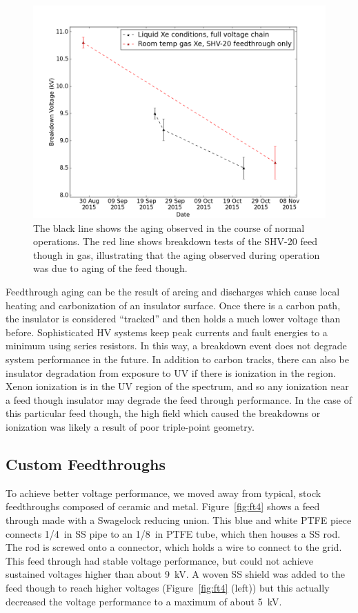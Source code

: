 \begin{figure}[htbp]
\begin{center}
\includegraphics[width=5in]{figures/testbed/shv20_breakdowns.png}
\caption{The black line shows the aging observed in the course of normal operations. The red line shows breakdown tests of the SHV-20 feed though in gas, illustrating that the aging observed during operation was due to aging of the feed though.}
\label{fig:aging}
\end{center}
\end{figure}

Feedthrough aging can be the result of arcing and discharges which cause local heating and carbonization of an insulator surface. Once there is a carbon path, the insulator is considered ``tracked'' and then holds a much lower voltage than before.  Sophisticated \ac{HV} systems keep peak currents and fault energies to a minimum using series resistors. In this way, a breakdown event does not degrade system performance in the future. In addition to carbon tracks, there can also be insulator degradation from exposure to UV if there is ionization in the region. Xenon ionization is in the UV region of the spectrum, and so any ionization near a feed though insulator may degrade the feed through performance. In the case of this particular feed though, the high field which caused the breakdowns or ionization was likely a result of poor triple-point geometry. 


\subsection{Custom Feedthroughs}
To achieve better voltage performance, we moved away from typical, stock feedthroughs composed of ceramic and metal. Figure~\ref{fig:ft4} shows a feed through made with a Swagelock reducing union. This blue and white PTFE piece connects 1/4~in \ac{SS} pipe to an 1/8~in PTFE tube, which then houses a \ac{SS} rod. The rod is screwed onto a connector, which holds a wire to connect to the grid. This feed through had stable voltage performance, but could not achieve sustained voltages higher than about 9~kV. A woven \ac{SS} shield was added to the feed though to reach higher voltages (Figure~\ref{fig:ft4} (left)) but this actually decreased the voltage performance to a maximum of about 5~kV.   

